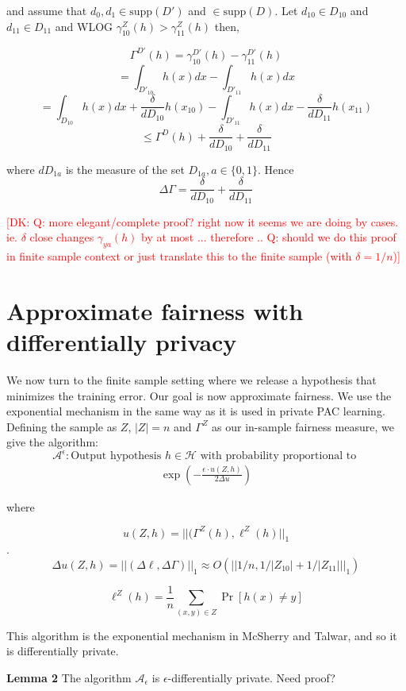 \documentclass[format = sigconf]{acmart}
\newcommand{\dk}[1]{\textcolor{red}{[DK: #1]}}
\newcommand{\A}{\mathcal{A}}
\newcommand{\1}{\mathbbm{1}}
\theoremstyle{definition}
\begin{document}
and assume that $d_0, d_1 \in \text{supp}(D')$ and $\in \text{supp}(D)$. Let $d_{10} \in D_{10}$ and $d_{11} \in D_{11}$ and WLOG $\gamma_{10}^Z(h) > \gamma_{11}^Z(h)$ then,

$$\Gamma^{D'}(h) = \gamma_{10}^{D'}(h) - \gamma_{11}^{D'}(h)$$
$$= \int_{D'_{10}}h(x)dx - \int_{D'_{11}}h(x)dx$$
$$= \int_{D_{10}}h(x)dx + \frac{\delta}{dD_{10}}h(x_{10}) - \int_{D'_{11}}h(x)dx - \frac{\delta}{dD_{11}}h(x_{11})$$
$$\leq \Gamma^{D}(h) + \frac{\delta}{dD_{10}} + \frac{\delta}{dD_{11}}$$

where $dD_{1a}$ is the measure of the set $D_{1a}, a \in \{0,1\}$. Hence
$$\Delta\Gamma = \frac{\delta}{dD_{10}} + \frac{\delta}{dD_{11}}$$

\dk{Q: more elegant/complete proof? right now it seems we are doing by cases. ie. $\delta$ close changes $\gamma_{ya}(h)$ by at most ... therefore ..
Q: should we do this proof in finite sample context or just translate this to the finite sample (with $\delta = 1/n$)}

\section{Approximate fairness with differentially privacy}



We now turn to the finite sample setting where we release a hypothesis that minimizes the training error. Our goal is now approximate fairness. We use the exponential mechanism in the same way as it is used in private PAC learning. Defining the sample as $Z$, $|Z| = n$ and $\Gamma^{Z}$ as our in-sample fairness measure, we give the algorithm:
$$\mathcal{A}^\epsilon : \text{Output hypothesis }h \in \mathcal{H} \text{ with probability proportional to }$$
\begin{align}
\exp(-\frac{\epsilon \cdot u(Z,h)}{2\Delta u})
\end{align}

where

$$u(Z,h) = ||(\Gamma^Z(h), \ell^Z(h)||_{1}$$.
$$\Delta u(Z,h) = ||(\Delta\ell,\Delta{\Gamma})||_1 \approx O(||1/n,1/|Z_{10}|+1/|Z_{11}|||_1)$$

$$\ell^Z(h) = \frac{1}{n} \sum_{(x,y) \in Z}\Pr[h(x) \neq y]$$



This algorithm is the exponential mechanism in McSherry and Talwar, and so it is differentially private.

{\bf Lemma 2} The algorithm $\A_\epsilon$ is $\epsilon$-differentially private.
Need proof?
\end{document}
